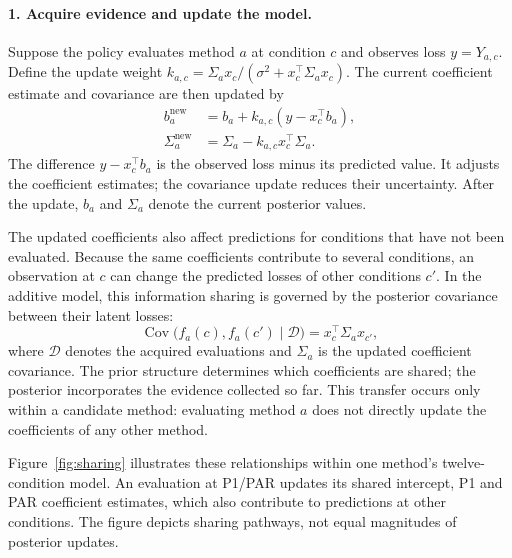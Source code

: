 \documentclass[10pt,a4paper]{article}
\begin{document}
\paragraph{1. Acquire evidence and update the model.}
Suppose the policy evaluates method $a$ at condition $c$ and observes loss $y=Y_{a,c}$. Define the update weight
$k_{a,c}=\Sigma_a x_c/(\sigma^2+x_c^\top\Sigma_a x_c)$.
The current coefficient estimate and covariance are then updated by
\begin{equation}
\begin{aligned}
b_a^{\mathrm{new}}&=b_a+k_{a,c}(y-x_c^\top b_a),\\
\Sigma_a^{\mathrm{new}}&=\Sigma_a-k_{a,c}x_c^\top\Sigma_a.
\end{aligned}
\label{eq:covupdate}
\end{equation}
The difference $y-x_c^\top b_a$ is the observed loss minus its predicted value. It adjusts the coefficient estimates; the covariance update reduces their uncertainty. After the update, $b_a$ and $\Sigma_a$ denote the current posterior values.

The updated coefficients also affect predictions for conditions that have not been evaluated. Because the same coefficients contribute to several conditions, an observation at $c$ can change the predicted losses of other conditions $c'$. In the additive model, this information sharing is governed by the posterior covariance between their latent losses:
\begin{equation}
\operatorname{Cov}\!\bigl(f_a(c),f_a(c')\mid\mathcal{D}\bigr)
=x_c^\top\Sigma_a x_{c'},
\label{eq:condition-covariance}
\end{equation}
where $\mathcal{D}$ denotes the acquired evaluations and $\Sigma_a$ is the updated coefficient covariance. The prior structure determines which coefficients are shared; the posterior incorporates the evidence collected so far. This transfer occurs only within a candidate method: evaluating method $a$ does not directly update the coefficients of any other method.

Figure~\ref{fig:sharing} illustrates these relationships within one method's twelve-condition model. An evaluation at P1/PAR updates its shared intercept, P1 and PAR coefficient estimates, which also contribute to predictions at other conditions. The figure depicts sharing pathways, not equal magnitudes of posterior updates.
\end{document}
